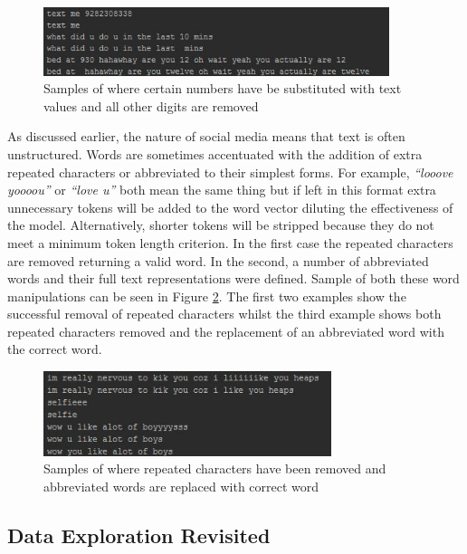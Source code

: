 \begin{figure}[htbp]
	\centering
	\includegraphics[width=0.9\textwidth]{Figures/Chapter4/remove_digits_01.jpg}
	\caption[Replace selected numerical ages with text then remove remaining digits]{Samples of where certain numbers have be substituted with text values and all other digits are removed}
	\label{fig:chapter4:remove_digit}
\end{figure}

As discussed earlier, the nature of social media means that text is often unstructured. Words are sometimes accentuated with the addition of extra repeated characters or abbreviated to their simplest forms. For example, \textit{``looove yoooou''} or \textit{``love u''} both mean the same thing but if left in this format extra unnecessary tokens will be added to the word vector diluting the effectiveness of the model. Alternatively, shorter tokens will be stripped because they do not meet a minimum token length criterion. In the first case the repeated characters are removed returning a valid word. In the second, a number of abbreviated words and their full text representations were defined. Sample of both these word manipulations can be seen in Figure \ref{fig:chapter4:remove_repeat}. The first two examples show the successful removal of repeated characters whilst the third example shows both repeated characters removed and the replacement of an abbreviated word with the correct word.

\begin{figure}[htbp]
	\centering
	\includegraphics[width=0.75\textwidth]{Figures/Chapter4/remove_repeat_01.jpg}
	\caption[Remove repeated characters and abbreviated words]{Samples of where repeated characters have been removed and abbreviated words are replaced with correct word}
	\label{fig:chapter4:remove_repeat}
\end{figure}


\subsection{Data Exploration Revisited}

